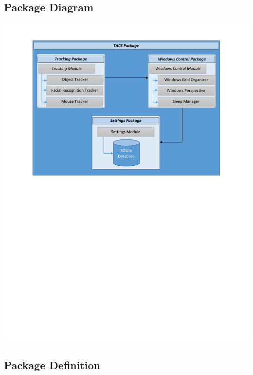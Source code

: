 \documentclass[titlepage]{article}
\begin{document}
\subsection{Package Diagram}
\begin{center}
	\includegraphics[trim={2cm 14cm 1cm 1cm},clip,scale=0.71]{package_diagram.pdf}
\end{center}

\newpage

\subsection{Package Definition}
\end{document}
